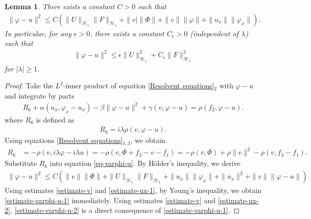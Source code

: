 \documentclass[11pt,reqno]{article}
\newtheorem{lemma}[theorem]{Lemma}
\begin{document}
  \begin{lemma}\label{lemma-varphi-u}
  	There exists a constant $C>0$ such that
  	\begin{align}\label{estimate-varphi-u-1}
  		\|\varphi - u\|^2 \leq C(\|U\|_{\mathcal{H}_1}\|F\|_{\mathcal{H}_1}  + \|v|\|\Phi\| + \|v\|\|\varphi\| + \|u_x\|\|\varphi_x\|).
  	\end{align}
  	In particular, for any $\epsilon>0$, there exists a constant $C_{\epsilon}>0$ (independent of $\lambda$) such that
  	\begin{align}\label{estimate-varphi-u-2}
  		\|\varphi - u\|^2 \leq \epsilon\|U\|_{\mathcal{H}_1}^2 + C_{\epsilon}\|F\|_{\mathcal{H}_1}^2
  	\end{align}
  	for $|\lambda| \geq 1$.
  \end{lemma}
  \begin{proof}
  	Take the $L^2$-inner product of equation \eqref{Resolvent equations}$_2$ with $\varphi-u$ and integrate by parts
  	\begin{align}\label{eq-varphi-u}
  		R_6 + \alpha (u_x, \varphi_x - u_x) - \beta \|\varphi - u\|^2 + \gamma (v, \varphi - u) = \rho (f_2, \varphi - u).
  	\end{align}
  	where $R_6$ is defined as
  	\begin{align*}
  		R_6=i \lambda \rho (v, \varphi - u).
  	\end{align*}
  	Using equations \eqref{Resolvent equations}$_{1,3}$, we obtain
  	\begin{align*}
  		R_6 &= -\rho (v, i \lambda \varphi - i \lambda u)
  		= -\rho (v, \Phi + f_3 - v - f_1)
  		= -\rho (v, \Phi) + \rho \|v\|^2 - \rho (v, f_3 - f_1).
  	\end{align*}
  	Substitute $R_6$ into equation \eqref{eq-varphi-u}. By H\"older's inequality, we derive
  	\begin{align*}
  		\|\varphi - u\|^2 \leq C(\|v\|\|\Phi\| + \|U\|_{\mathcal{H}_1}\|F\|_{\mathcal{H}_1} + \|u_x\|\|\varphi_x\| + \|u_x\|^2 + \|v\|\|\varphi - u\|)
  	\end{align*}
  	Using estimates \eqref{estimate-v} and \eqref{estimate-ux-1}, by Young's inequality, we obtain \eqref{estimate-varphi-u-1} immediately. Using estimates \eqref{estimate-v} and \eqref{estimate-ux-2}, \eqref{estimate-varphi-u-2} is a direct consequence of \eqref{estimate-varphi-u-1}.
  \end{proof}
\end{document}
